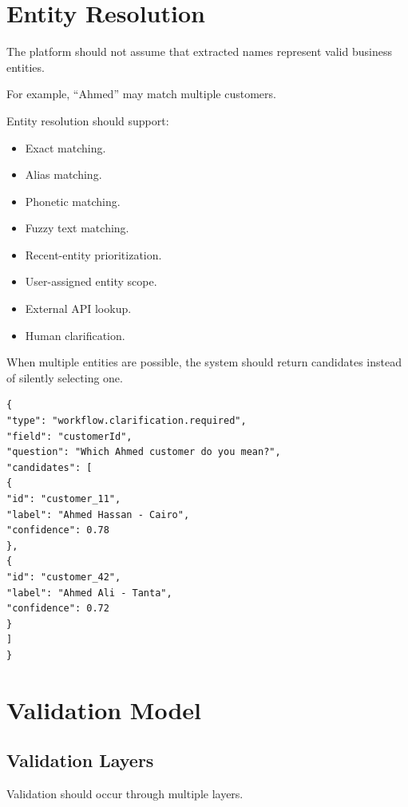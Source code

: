 \documentclass[11pt,a4paper]{article}
\begin{document}
\section{Entity Resolution}

The platform should not assume that extracted names represent valid
business entities.

For example, ``Ahmed'' may match multiple customers.

Entity resolution should support:

\begin{itemize}
\item Exact matching.
\item Alias matching.
\item Phonetic matching.
\item Fuzzy text matching.
\item Recent-entity prioritization.
\item User-assigned entity scope.
\item External API lookup.
\item Human clarification.
\end{itemize}

When multiple entities are possible, the system should return candidates
instead of silently selecting one.

\begin{lstlisting}[language={},caption={Entity ambiguity event}]
{
"type": "workflow.clarification.required",
"field": "customerId",
"question": "Which Ahmed customer do you mean?",
"candidates": [
{
"id": "customer_11",
"label": "Ahmed Hassan - Cairo",
"confidence": 0.78
},
{
"id": "customer_42",
"label": "Ahmed Ali - Tanta",
"confidence": 0.72
}
]
}
\end{lstlisting}

\section{Validation Model}

\subsection{Validation Layers}

Validation should occur through multiple layers.
\end{document}
